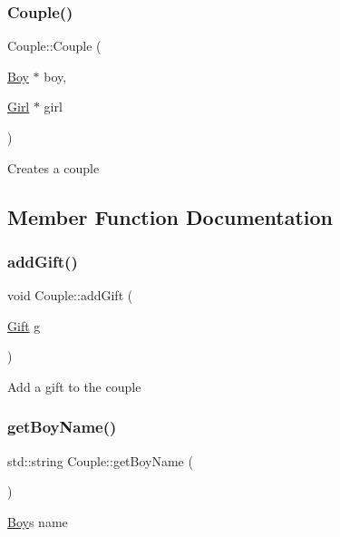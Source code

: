 \subsubsection{\texorpdfstring{Couple()}{Couple()}}
{\footnotesize\ttfamily Couple\+::\+Couple (\begin{DoxyParamCaption}\item[{\hyperlink{class_boy}{Boy} $\ast$}]{boy,  }\item[{\hyperlink{class_girl}{Girl} $\ast$}]{girl }\end{DoxyParamCaption})}

Creates a couple 

\subsection{Member Function Documentation}
\mbox{\label{class_couple_a74d14c0dab7fb45bd203e9c55d791883}} 
\subsubsection{\texorpdfstring{add\+Gift()}{addGift()}}
{\footnotesize\ttfamily void Couple\+::add\+Gift (\begin{DoxyParamCaption}\item[{\hyperlink{class_gift}{Gift}}]{g }\end{DoxyParamCaption})}

Add a gift to the couple \mbox{\label{class_couple_a9e0bcd12b5436edd4546bfb0f3a43e73}} 
\subsubsection{\texorpdfstring{get\+Boy\+Name()}{getBoyName()}}
{\footnotesize\ttfamily std\+::string Couple\+::get\+Boy\+Name (\begin{DoxyParamCaption}{ }\end{DoxyParamCaption})}

\hyperlink{class_boy}{Boy}\textquotesingle{}s name \mbox{\label{class_couple_a9b73843688fdaf6af8bef3c944f0143d}} 
